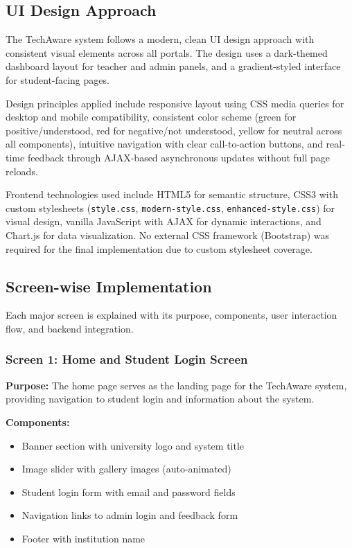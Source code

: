 \subsection{UI Design Approach}

The TechAware system follows a modern, clean UI design approach with consistent visual elements across all portals. The design uses a dark-themed dashboard layout for teacher and admin panels, and a gradient-styled interface for student-facing pages.

Design principles applied include responsive layout using CSS media queries for desktop and mobile compatibility, consistent color scheme (green for positive/understood, red for negative/not understood, yellow for neutral across all components), intuitive navigation with clear call-to-action buttons, and real-time feedback through AJAX-based asynchronous updates without full page reloads.

Frontend technologies used include HTML5 for semantic structure, CSS3 with custom stylesheets (\texttt{style.css}, \texttt{modern-style.css}, \texttt{enhanced-style.css}) for visual design, vanilla JavaScript with AJAX for dynamic interactions, and Chart.js for data visualization. No external CSS framework (Bootstrap) was required for the final implementation due to custom stylesheet coverage.


\subsection{Screen-wise Implementation}

Each major screen is explained with its purpose, components, user interaction flow, and backend integration.

\subsubsection{Screen 1: Home and Student Login Screen}

\textbf{Purpose:}  
The home page serves as the landing page for the TechAware system, providing navigation to student login and information about the system.

\textbf{Components:}
\begin{itemize}
    \item Banner section with university logo and system title
    \item Image slider with gallery images (auto-animated)
    \item Student login form with email and password fields
    \item Navigation links to admin login and feedback form
    \item Footer with institution name
\end{itemize}

